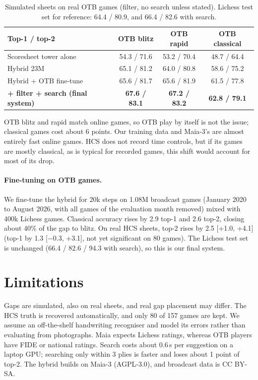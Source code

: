 \documentclass[11pt]{article}
\begin{document}
\begin{table}[t]
\centering
\small
\begin{tabular}{lccc}
\toprule
Top-1 / top-2 & OTB blitz & OTB rapid & OTB classical \\
\midrule
Scoresheet tower alone & 54.3 / 71.6 & 53.2 / 70.4 & 48.7 / 64.4 \\
Hybrid 23M & 65.1 / 81.2 & 64.0 / 80.8 & 58.6 / 75.2 \\
Hybrid + OTB fine-tune & 65.6 / 81.7 & 65.6 / 81.9 & 61.5 / 77.8 \\
\textbf{+ filter + search (final system)} & \textbf{67.6 / 83.1} & \textbf{67.2 / 83.2} & \textbf{62.8 / 79.1} \\
\bottomrule
\end{tabular}
\caption{Simulated sheets on real OTB games (filter, no search unless stated). Lichess test set for reference: 64.4 / 80.9, and 66.4 / 82.6 with search.}
\label{tab:otb}
\end{table}

OTB blitz and rapid match online games, so OTB play by itself is not the issue; classical games cost about 6 points. Our training data and Maia-3's are almost entirely fast online games. HCS does not record time controls, but if its games are mostly classical, as is typical for recorded games, this shift would account for most of its drop.

\paragraph{Fine-tuning on OTB games.} We fine-tune the hybrid for 20k steps on 1.08M broadcast games (January 2020 to August 2026, with all games of the evaluation month removed) mixed with 400k Lichess games. Classical accuracy rises by 2.9 top-1 and 2.6 top-2, closing about 40\% of the gap to blitz. On real HCS sheets, top-2 rises by 2.5 [+1.0, +4.1] (top-1 by 1.3 [$-0.3$, +3.1], not yet significant on 80 games). The Lichess test set is unchanged (66.4 / 82.6 / 94.3 with search), so this is our final system.

\section{Limitations}
Gaps are simulated, also on real sheets, and real gap placement may differ. The HCS truth is recovered automatically, and only 80 of 157 games are kept. We assume an off-the-shelf handwriting recogniser and model its errors rather than evaluating from photographs. Maia expects Lichess ratings, whereas OTB players have FIDE or national ratings. Search costs about 0.6\,s per suggestion on a laptop GPU; searching only within 3 plies is faster and loses about 1 point of top-2. The hybrid builds on Maia-3 (AGPL-3.0), and broadcast data is CC BY-SA.
\end{document}
